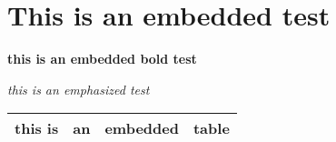 \documentclass[12pt]{article}
\begin{document}
\section*{This is an embedded test} 

\textbf{this is an embedded bold test}

\emph{this is an emphasized test}

\begin{tabular}{|c|c|c|c|}
\hline
this is & an & embedded & table \\
\hline
\end{tabular}
\end{document}
